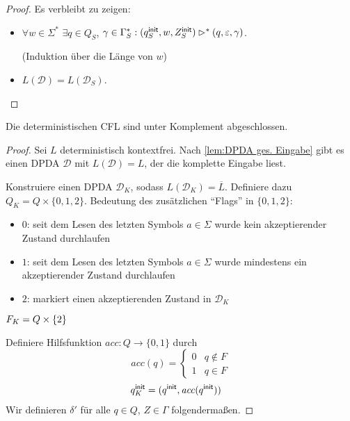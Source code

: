 {\begin{proof}
  Es verbleibt zu zeigen:
  \begin{itemize}
   \item $\forall w\in \Sigma^*$ $\exists q\in Q_S$,
  $\gamma\in\Gamma_S^*: (q^\mathsf{init}_S, w, Z^\mathsf{init}_S) \rhd^* (q,
  \varepsilon, \gamma)$.
  
  (Induktion über die Länge von $w$)
  \item $L (\mathcal{D}) = L (\mathcal{D}_S)$.
  \qedhere
  \end{itemize}
\end{proof}

\begin{Satz}[name={[Abgeschlossenheit der deterministischen \acs*{CFL}]}]
        Die deterministischen \ac{CFL} sind unter Komplement abgeschlossen.
\end{Satz}
\begin{proof}
  Sei $L$ deterministisch kontextfrei. 
  Nach \autoref{lem:DPDA ges. Eingabe} gibt es einen \ac{DPDA} $\mathcal{D}$ mit $L(\mathcal{D})=L$, der die komplette Eingabe liest.

  Konstruiere einen \ac{DPDA} $\mathcal{D}_K$, sodass $ L(\mathcal{D}_K) = \overline{L}$. 
  Definiere dazu $Q_K= Q \times \{0,1,2\}$. Bedeutung des zusätzlichen "`Flags"' in $\{0,1,2\}$:
  \begin{itemize}
  \item $0$: seit dem Lesen des letzten Symbols $a \in \Sigma$ wurde kein akzeptierender Zustand durchlaufen
  \item $1$: seit dem Lesen des letzten Symbols $a \in \Sigma$ wurde mindestens ein
    akzeptierender Zustand durchlaufen 
  \item $2$: markiert einen akzeptierenden Zustand in $\mathcal{D}_K$
  \end{itemize}
        
  $F_K=Q\times \{2\}$

  Definiere Hilfsfunktion $\mathit{acc}:Q\to \{0,1\}$ durch 
  \begin{displaymath}
    \mathit{acc} (q) =
    \begin{cases}
      0 & q\notin F \\ 1 & q \in F
    \end{cases}
  \end{displaymath}
  \begin{align*}
    q^\mathsf{init}_K &= (q^\mathsf{init},\mathit{acc} (q^\mathsf{init}))
  \end{align*}
  Wir definieren $\delta'$ für alle $q \in Q$, $Z\in\Gamma$ folgendermaßen.
  

\end{proof}}
